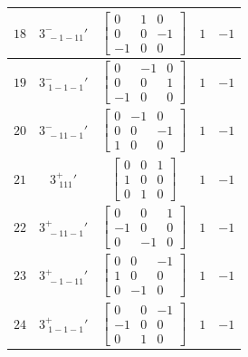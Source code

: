 \documentclass[fleqn,8pt]{jsarticle}
\begin{document}
\begin{longtable}{ccccc}
$ 18 $ & $ 3^{-}_{\,\,-1-11}{}' $ & $ \begin{bmatrix} 0 & 1 & 0 \\ 0 & 0 & -1 \\ -1 & 0 & 0 \end{bmatrix} $ & $ 1 $ & $ -1 $ \\ \hline
$ 19 $ & $ 3^{-}_{\,\,1-1-1}{}' $ & $ \begin{bmatrix} 0 & -1 & 0 \\ 0 & 0 & 1 \\ -1 & 0 & 0 \end{bmatrix} $ & $ 1 $ & $ -1 $ \\ \hline
$ 20 $ & $ 3^{-}_{\,\,-11-1}{}' $ & $ \begin{bmatrix} 0 & -1 & 0 \\ 0 & 0 & -1 \\ 1 & 0 & 0 \end{bmatrix} $ & $ 1 $ & $ -1 $ \\ \hline
$ 21 $ & $ 3^{+}_{\,\,111}{}' $ & $ \begin{bmatrix} 0 & 0 & 1 \\ 1 & 0 & 0 \\ 0 & 1 & 0 \end{bmatrix} $ & $ 1 $ & $ -1 $ \\ \hline
$ 22 $ & $ 3^{+}_{\,\,-11-1}{}' $ & $ \begin{bmatrix} 0 & 0 & 1 \\ -1 & 0 & 0 \\ 0 & -1 & 0 \end{bmatrix} $ & $ 1 $ & $ -1 $ \\ \hline
$ 23 $ & $ 3^{+}_{\,\,-1-11}{}' $ & $ \begin{bmatrix} 0 & 0 & -1 \\ 1 & 0 & 0 \\ 0 & -1 & 0 \end{bmatrix} $ & $ 1 $ & $ -1 $ \\ \hline
$ 24 $ & $ 3^{+}_{\,\,1-1-1}{}' $ & $ \begin{bmatrix} 0 & 0 & -1 \\ -1 & 0 & 0 \\ 0 & 1 & 0 \end{bmatrix} $ & $ 1 $ & $ -1 $ \\
\end{longtable}
\end{document}

